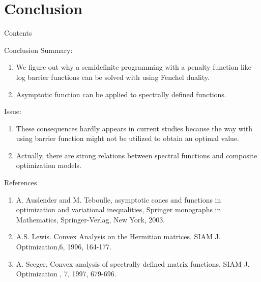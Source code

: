 \documentclass[aspectratio=169, dvipdfmx, 11pt]{beamer} %
\begin{document}
\section{Conclusion}
\begin{frame}{Contents}
  \tableofcontents[currentsection]
\end{frame}

\begin{frame}{Conclusion}
  Summary:
  \begin{enumerate}[]
    \item We figure out why a semidefinite programming with a penalty function like log barrier functions can be solved with using Fenchel duality.
    \item Asymptotic function can be applied to spectrally defined functions.
  \end{enumerate}
  Issue:
  \begin{enumerate}[]
    \item These consequences hardly appears in current studies because the way with using barrier function might not be utilized to obtain an optimal value.
    \item Actually, there are strong relations between spectral functions and composite optimization models.
  \end{enumerate}
\end{frame}

\begin{frame}[t]{References}
  \begin{enumerate}[]
    \item A. Auslender and M. Teboulle, asymptotic cones and functions in optimization and variational inequalities, Springer monographs in Mathematics, Springer-Verlag, New York, 2003.
    \item A.S. Lewis. Convex Analysis on the Hermitian matrices. SIAM J. Optimization,6, 1996, 164-177.
    \item A. Seeger. Convex analysis of spectrally defined matrix functions. SIAM J. Optimization , 7, 1997, 679-696.
  \end{enumerate}
\end{frame}
\end{document}
